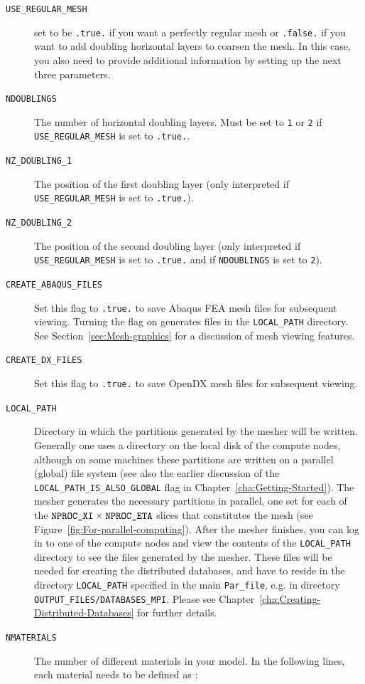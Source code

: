 \begin{description}
\item [{\texttt{USE\_REGULAR\_MESH}}] set to be \texttt{.true.} if you
want a perfectly regular mesh or \texttt{.false.} if you want to add
doubling horizontal layers to coarsen the mesh. In this case, you
also need to provide additional information by setting up the next
three parameters.
\item [{\texttt{NDOUBLINGS}}] The number of horizontal doubling layers.
Must be set to \texttt{1} or \texttt{2} if \texttt{USE\_REGULAR\_MESH}
is set to \texttt{.true.}.
\item [{\texttt{NZ\_DOUBLING\_1}}] The position of the first doubling layer
(only interpreted if \texttt{USE\_REGULAR\_MESH} is set to \texttt{.true.}).
\item [{\texttt{NZ\_DOUBLING\_2}}] The position of the second doubling
layer (only interpreted if \texttt{USE\_REGULAR\_MESH} is set to \texttt{.true.}
and if \texttt{NDOUBLINGS} is set to \texttt{2}).
\item [{\texttt{CREATE\_ABAQUS\_FILES}}] Set this flag to \texttt{.true.}
to save Abaqus FEA  mesh files
for subsequent viewing. Turning the flag on generates files in the
\texttt{LOCAL\_PATH} directory. See Section~\ref{sec:Mesh-graphics}
for a discussion of mesh viewing features.
\item [{\texttt{CREATE\_DX\_FILES}}] Set this flag to \texttt{.true.} to
save OpenDX  mesh files for subsequent
viewing.
\item [{\texttt{LOCAL\_PATH}}] Directory in which the partitions generated
by the mesher will be written. Generally one uses a directory on the
local disk of the compute nodes, although on some machines these partitions
are written on a parallel (global) file system (see also the earlier
discussion of the \texttt{LOCAL\_PATH\_IS\_ALSO\_GLOBAL} flag in Chapter~\ref{cha:Getting-Started}).
The mesher generates the necessary partitions in parallel, one set
for each of the $\mbox{\texttt{NPROC\_XI\/}}\times\mbox{\texttt{NPROC\_ETA\/}}$ slices that constitutes
the mesh (see Figure~\ref{fig:For-parallel-computing}). After the
mesher finishes, you can log in to one of the compute nodes and view
the contents of the \texttt{LOCAL\_PATH} directory to see the files
generated by the mesher. These files will be needed for creating the
distributed databases, and have to reside in the directory \texttt{LOCAL\_PATH}
specified in the main \texttt{Par\_file}, e.g. in directory \texttt{OUTPUT\_FILES/DATABASES\_MPI}.
Please see Chapter~\ref{cha:Creating-Distributed-Databases} for
further details.
\item [{\texttt{NMATERIALS}}] The number of different materials in your
model. In the following lines, each material needs to be defined as
:


\end{description}
